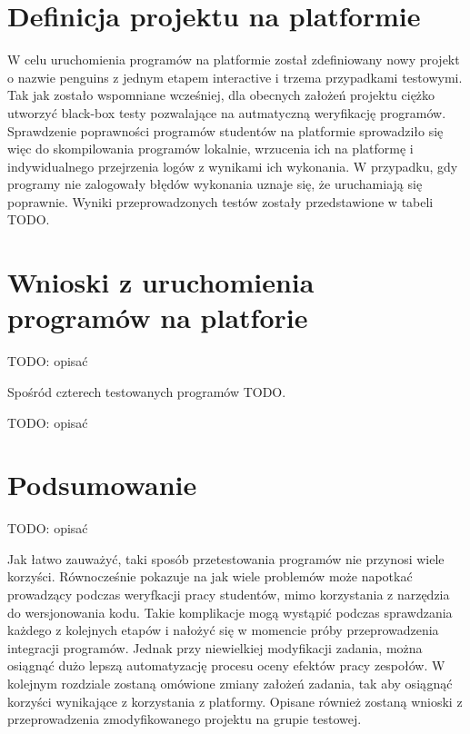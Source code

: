 \section{Definicja projektu na platformie}

W celu uruchomienia programów na platformie został zdefiniowany nowy projekt o nazwie penguins z jednym etapem interactive i trzema przypadkami testowymi.
Tak jak zostało wspomniane wcześniej, dla obecnych założeń projektu ciężko utworzyć black-box testy pozwalające na autmatyczną weryfikację programów.
Sprawdzenie poprawności programów studentów na platformie sprowadziło się więc do skompilowania programów lokalnie, wrzucenia ich na platformę i indywidualnego przejrzenia logów z wynikami ich wykonania.
W przypadku, gdy programy nie zalogowały błędów wykonania uznaje się, że uruchamiają się poprawnie.
Wyniki przeprowadzonych testów zostały przedstawione w tabeli TODO.


\section{Wnioski z uruchomienia programów na platforie}

TODO: opisać

Spośród czterech testowanych programów TODO.


TODO: opisać


\section{Podsumowanie}
\label{verification_summary}


TODO: opisać

Jak łatwo zauważyć, taki sposób przetestowania programów nie przynosi wiele korzyści.
Równocześnie pokazuje na jak wiele problemów może napotkać prowadzący podczas weryfkacji pracy studentów, mimo korzystania z narzędzia do wersjonowania kodu.
Takie komplikacje mogą wystąpić podczas sprawdzania każdego z kolejnych etapów i nałożyć się w momencie próby przeprowadzenia integracji programów.
Jednak przy niewielkiej modyfikacji zadania, można osiągnąć dużo lepszą automatyzację procesu oceny efektów pracy zespołów.
W kolejnym rozdziale zostaną omówione zmiany założeń zadania, tak aby osiągnąć korzyści wynikające z korzystania z platformy.
Opisane również zostaną wnioski z przeprowadzenia zmodyfikowanego projektu na grupie testowej.
